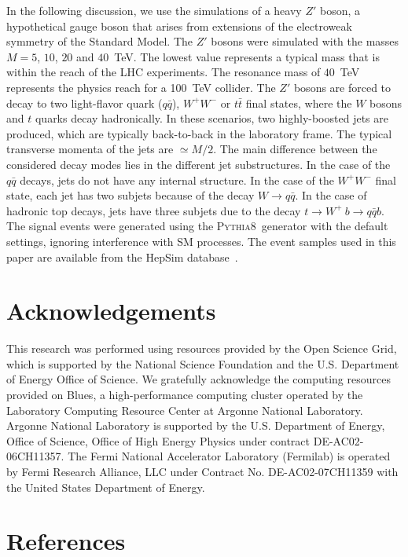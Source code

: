 \documentclass[final,1p,11pt]{elsarticle}
\newcommand{\pythia} {\textsc{Pythia8~}}
\begin{document}
In the following discussion, we use the simulations of a heavy $Z'$ boson, 
a hypothetical gauge boson  that arises from extensions of the electroweak symmetry of the Standard Model.
The $Z'$ bosons were simulated with the masses $M=5$, $10$, $20$ and $40$~TeV. The lowest value 
represents a typical mass that is within the reach of the LHC experiments. The  resonance mass of $40$~TeV 
represents the physics reach for a  100~TeV collider. The $Z'$ bosons are forced to decay to two light-flavor quark ($q\bar{q}$), $W^+W^-$ or $t\bar{t}$ final states, where the 
$W$ bosons and $t$ quarks decay hadronically. In these scenarios, two highly-boosted
jets are produced,  which are typically back-to-back in the laboratory frame.
The typical transverse momenta of the jets are $\simeq M/2$.
The main difference between the considered decay modes lies in the different jet substructures. In the case of the $q\bar{q}$ decays,
jets do not have any internal structure. In the case of the $W^+W^-$ final state, each jet has two subjets  because of the decay $W\rightarrow q\bar{q}$. In the case of hadronic top decays, jets have three subjets due
to the decay $t \rightarrow  W^+\>b \rightarrow q\bar{q} b$.    
The signal events were generated using the \pythia generator with the default settings,
ignoring interference with SM processes.
The event samples used in this paper are  available from the
HepSim  database~\cite{Chekanov:2014fga}.















\section*{Acknowledgements}
This research was performed using resources provided by the Open Science Grid,
which is supported by the National Science Foundation and the U.S. Department of Energy Office of Science. 
We gratefully acknowledge the computing resources provided on Blues, 
a high-performance computing cluster operated by the Laboratory Computing Resource Center at Argonne National Laboratory.
Argonne National Laboratory is supported by the U.S. Department of Energy, Office of Science, Office of High Energy Physics  under contract DE-AC02-06CH11357. The Fermi National Accelerator Laboratory (Fermilab) is operated by Fermi Research Alliance, LLC under Contract No. DE-AC02-07CH11359 with the United States Department of Energy.

\newpage
\section*{References}


\def\bibname{\Large\bf References}
\def\refname{\Large\bf References}
\pagestyle{plain}

\end{document}
